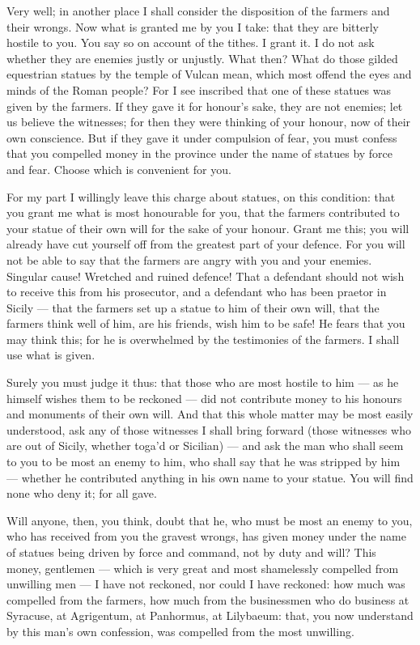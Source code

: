  Very well; in another place I shall consider the disposition of the farmers and their wrongs. Now what is granted me by you I take: that they are bitterly hostile to you. You say so on account of the tithes. I grant it. I do not ask whether they are enemies justly or unjustly. What then? What do those gilded equestrian statues by the temple of Vulcan mean, which most offend the eyes and minds of the Roman people? For I see inscribed that one of these statues was given by the farmers. If they gave it for honour's sake, they are not enemies; let us believe the witnesses; for then they were thinking of your honour, now of their own conscience. But if they gave it under compulsion of fear, you must confess that you compelled money in the province under the name of statues by force and fear. Choose which is convenient for you.

 For my part I willingly leave this charge about statues, on this condition: that you grant me what is most honourable for you, that the farmers contributed to your statue of their own will for the sake of your honour. Grant me this; you will already have cut yourself off from the greatest part of your defence. For you will not be able to say that the farmers are angry with you and your enemies. Singular cause! Wretched and ruined defence! That a defendant should not wish to receive this from his prosecutor, and a defendant who has been praetor in Sicily --- that the farmers set up a statue to him of their own will, that the farmers think well of him, are his friends, wish him to be safe! He fears that you may think this; for he is overwhelmed by the testimonies of the farmers. I shall use what is given.

 Surely you must judge it thus: that those who are most hostile to him --- as he himself wishes them to be reckoned --- did not contribute money to his honours and monuments of their own will. And that this whole matter may be most easily understood, ask any of those witnesses I shall bring forward (those witnesses who are out of Sicily, whether toga'd or Sicilian) --- and ask the man who shall seem to you to be most an enemy to him, who shall say that he was stripped by him --- whether he contributed anything in his own name to your statue. You will find none who deny it; for all gave.

 Will anyone, then, you think, doubt that he, who must be most an enemy to you, who has received from you the gravest wrongs, has given money under the name of statues being driven by force and command, not by duty and will? This money, gentlemen --- which is very great and most shamelessly compelled from unwilling men --- I have not reckoned, nor could I have reckoned: how much was compelled from the farmers, how much from the businessmen who do business at Syracuse, at Agrigentum, at Panhormus, at Lilybaeum: that, you now understand by this man's own confession, was compelled from the most unwilling.

